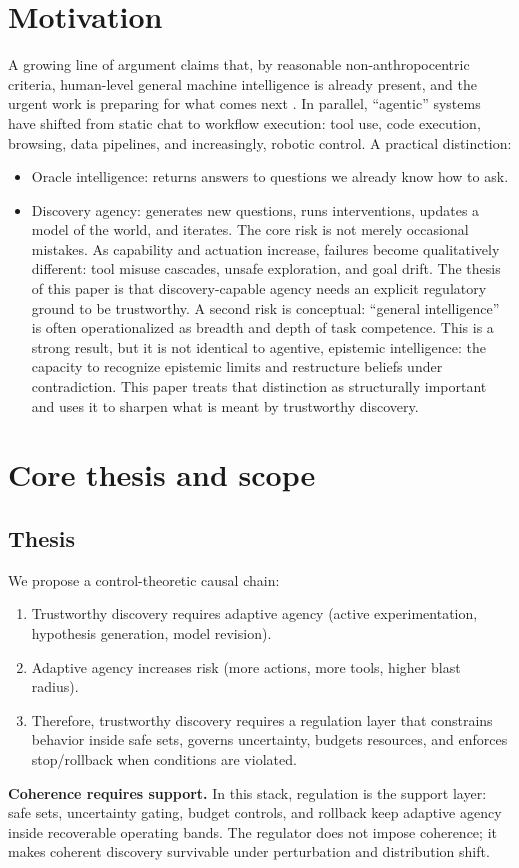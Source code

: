 \documentclass[11pt]{article}
\begin{document}
\section{Motivation}
A growing line of argument claims that, by reasonable non-anthropocentric criteria, human-level
general machine intelligence is already present, and the urgent work is preparing for what comes
next \citep{chen2026nature}. In parallel, “agentic” systems have shifted from static chat to workflow execution: tool use,
code execution, browsing, data pipelines, and increasingly, robotic control.
A practical distinction:
\begin{itemize}
\item 
Oracle intelligence: returns answers to questions we already know how to ask.
\item 
Discovery agency: generates new questions, runs interventions, updates a model of the world,
and iterates.
The core risk is not merely occasional mistakes. As capability and actuation increase, failures
become qualitatively different: tool misuse cascades, unsafe exploration, and goal drift. The thesis
of this paper is that discovery-capable agency needs an explicit regulatory ground to be trustworthy.
A second risk is conceptual: “general intelligence” is often operationalized as breadth and depth
of task competence. This is a strong result, but it is not identical to agentive, epistemic intelligence:
the capacity to recognize epistemic limits and restructure beliefs under contradiction. This paper
treats that distinction as structurally important and uses it to sharpen what is meant by trustworthy
discovery.
\end{itemize}
\section{Core thesis and scope}
\subsection{Thesis}
We propose a control-theoretic causal chain:
\begin{enumerate}
\item Trustworthy discovery requires adaptive agency (active experimentation, hypothesis generation,
model revision).
\item Adaptive agency increases risk (more actions, more tools, higher blast radius).
\item Therefore, trustworthy discovery requires a regulation layer that constrains behavior inside
safe sets, governs uncertainty, budgets resources, and enforces stop/rollback when conditions are
violated.
\end{enumerate}
\noindent\textbf{Coherence requires support.} In this stack, regulation is the support layer: safe sets, uncertainty gating, budget controls, and rollback keep adaptive agency inside recoverable operating bands. The regulator does not impose coherence; it makes coherent discovery survivable under perturbation and distribution shift.
\end{document}
